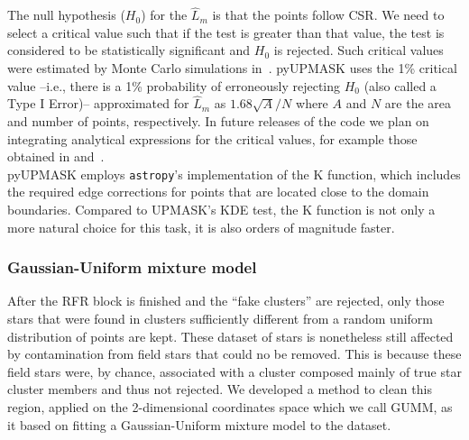 \documentclass[draft]{aa}
\begin{document}
 The null hypothesis ($H_0$) for the $\hat{L}_{m}$ is that the points follow
 CSR. We need to select a critical value such that if the test is
 greater than that value, the test is considered to be statistically
 significant and $H_0$ is rejected.
 Such critical values were estimated by Monte Carlo simulations
 in~\cite{ripley_1979}. pyUPMASK uses the 1\% critical value --i.e.,
 there is a 1\% probability of erroneously rejecting $H_0$ (also called a
 Type I Error)-- approximated for $\hat{L}_{m}$ as $1.68\sqrt{A}/N$ where
 $A$ and $N$ are the area and number of points, respectively.
 In future releases of the code we plan on integrating analytical
 expressions for the critical values, for example those obtained in
 \cite{Lagache_2013} and~\cite{Marcon_2013}.\\

 pyUPMASK employs \texttt{astropy}'s implementation of the K function, which
 includes the required edge corrections for points that are located close to
 the domain boundaries. Compared to UPMASK's KDE test, the K function is not
 only a more natural choice for this task, it is also orders of magnitude
 faster.



\subsubsection{Gaussian-Uniform mixture model}
 \label{sssec:gumm}

 After the RFR block is finished and the ``fake clusters'' are rejected, only
 those stars that were found in clusters sufficiently different from a random
 uniform distribution of points are kept. These dataset of stars is
 nonetheless still affected by contamination from field stars that could no be
 removed. This is because these field stars were, by chance, associated with a
 cluster composed mainly of true star cluster members and thus not rejected.
 We developed a method to clean this region, applied on the 2-dimensional
 coordinates space which we call GUMM, as it based on fitting a
 Gaussian-Uniform mixture model to the dataset.
\end{document}
